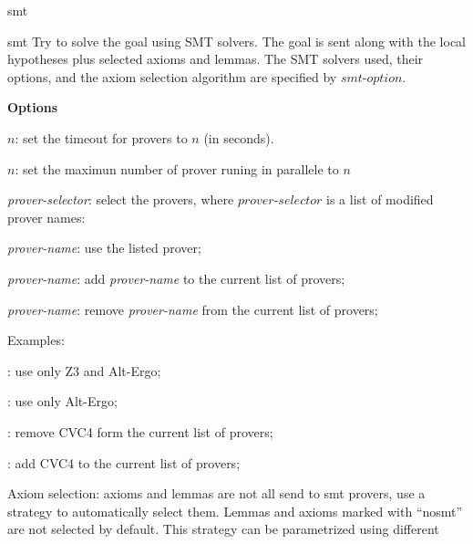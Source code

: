 \begin{tactic}{smt}
  \begin{tsyntax}[empty]{smt}
  Try to solve the goal using SMT solvers. The goal is sent along with
  the local hypotheses plus selected axioms and lemmas. The SMT
  solvers used, their options, and the axiom selection algorithm are
  specified by $\textit{smt-option}$.

  \textbf{Options}
  \begin{compactitem}
    \item {}$n$: set the timeout for provers to $n$ (in seconds).
    \item {}$n$: set the maximun number of prover runing in 
          parallele to $n$ 
    \item \ec{prover=[}\textit{prover-selector}\ec{]}: select the
      provers, where $\textit{prover-selector}$ is a list of modified
      prover names:
          \begin{compactitem}
            \item {}\textit{prover-name}: use the
              listed prover;
            \item {}\textit{prover-name}: add
              \textit{prover-name} to the current list of provers;
            \item {}\textit{prover-name}: remove
              \textit{prover-name} from the current list of provers;
          \end{compactitem}
          Examples:
          \begin{compactitem}
          \item {}: use only Z3 and Alt-Ergo;
          \item {}: use only Alt-Ergo;
          \item \ec{[-''CVC4'']}: remove CVC4 form the current list of
            provers;
          \item \ec{[+''CVC4'']}: add CVC4 to the current list of provers;
          \end{compactitem}
     \item Axiom selection: axioms and lemmas are not all send to smt
       provers, \EasyCrypt use a strategy to automatically select
       them. Lemmas and axioms marked with ``nosmt'' are not selected
       by default. This strategy can be parametrized using different

\end{compactitem}
\end{tsyntax}
\end{tactic}
